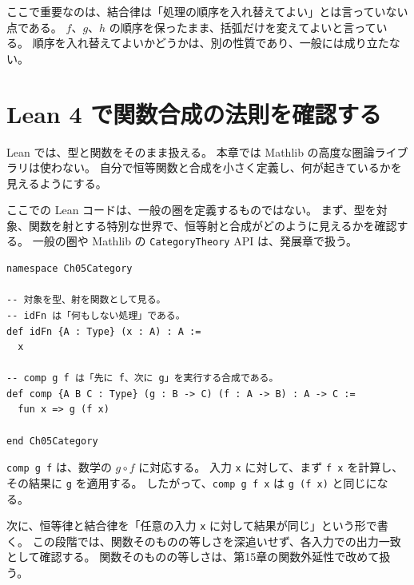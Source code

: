 
ここで重要なのは、結合律は「処理の順序を入れ替えてよい」とは言っていない点である。
\(f\)、\(g\)、\(h\) の順序を保ったまま、括弧だけを変えてよいと言っている。
順序を入れ替えてよいかどうかは、別の性質であり、一般には成り立たない。

\section{Lean 4 で関数合成の法則を確認する}

Lean では、型と関数をそのまま扱える。
本章では Mathlib の高度な圏論ライブラリは使わない。
自分で恒等関数と合成を小さく定義し、何が起きているかを見えるようにする。

\begin{leanbox}
ここでの Lean コードは、一般の圏を定義するものではない。
まず、型を対象、関数を射とする特別な世界で、恒等射と合成がどのように見えるかを確認する。
一般の圏や Mathlib の \texttt{CategoryTheory} API は、発展章で扱う。
\end{leanbox}

\begin{listing}[htbp]
\begin{verbatim}
namespace Ch05Category

-- 対象を型、射を関数として見る。
-- idFn は「何もしない処理」である。
def idFn {A : Type} (x : A) : A :=
  x

-- comp g f は「先に f、次に g」を実行する合成である。
def comp {A B C : Type} (g : B -> C) (f : A -> B) : A -> C :=
  fun x => g (f x)

end Ch05Category
\end{verbatim}
\caption{恒等関数と関数合成を小さく定義する}
\label{lst:ch05_id_comp}
\end{listing}

\texttt{comp g f} は、数学の \(g \circ f\) に対応する。
入力 \texttt{x} に対して、まず \texttt{f x} を計算し、その結果に \texttt{g} を適用する。
したがって、\texttt{comp g f x} は \texttt{g (f x)} と同じになる。

次に、恒等律と結合律を「任意の入力 \texttt{x} に対して結果が同じ」という形で書く。
この段階では、関数そのものの等しさを深追いせず、各入力での出力一致として確認する。
関数そのものの等しさは、第15章の関数外延性で改めて扱う。

